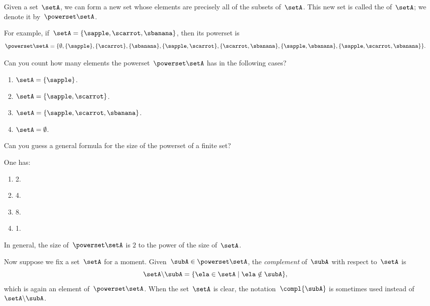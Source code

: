 Given a set~$\setA$, we can form a new set whose elements are precisely all of the subsets of~$\setA$.
This new set is called the  of~$\setA$; we denote it by~$\powerset \setA$.

For example, if~$\setA = \{ \sapple, \scarrot, \sbanana \}$, then its powerset is
\begin{equation*}
    \powerset \setA = \{ \emptyset, \{ \sapple \}, \{ \scarrot \}, \{ \sbanana\}, \{ \sapple, \scarrot \}, \{ \scarrot, \sbanana \}, \{ \sapple, \sbanana\}, \{ \sapple, \scarrot, \sbanana \} \}.
\end{equation*}

\begin{exercise}
    Can you count how many elements the powerset~$\powerset \setA$ has in the following cases?
    \begin{enumerate}
        \item $\setA = \{ \sapple \} $.
        \item $\setA = \{ \sapple, \scarrot \} $.
        \item $\setA = \{ \sapple, \scarrot, \sbanana \} $.
        \item $\setA = \emptyset $.
    \end{enumerate}
    Can you guess a general formula for the size of the powerset of a finite set?
\end{exercise}

\begin{solution}
    One has:
    \begin{enumerate}
        \item 2.
        \item 4.
        \item 8.
        \item 1.
    \end{enumerate}
    In general, the size of~$\powerset \setA$ is $2$ to the power of the size of~$\setA$.
\end{solution}

Now suppose we fix a set~$\setA$ for a moment.
Given~$\subA \in \powerset \setA$, the \emph{complement} of~$\subA$ with respect to~$\setA$ is
\begin{equation*}
    \setA \backslash \subA = \{ \ela \in \setA \mid \ela \notin \subA \},
\end{equation*}
which is again an element of~$\powerset \setA$.
When the set~$\setA$ is clear, the notation~$\compl{\subA}$ is sometimes used instead of~$\setA \backslash \subA$.

